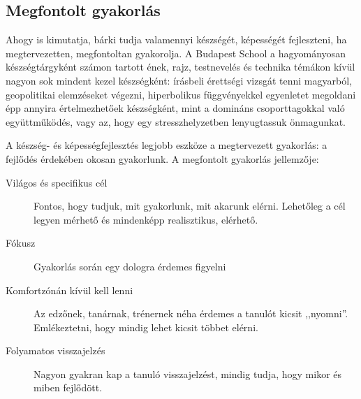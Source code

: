\subsection{Megfontolt gyakorlás}
Ahogy \citep{ericsson2016peak} is kimutatja, bárki tudja valamennyi készségét, képességét fejleszteni, ha megtervezetten, megfontoltan gyakorolja. A Budapest School a hagyományosan készségtárgyként számon tartott ének, rajz, testnevelés és technika témákon kívül nagyon sok mindent kezel készségként: írásbeli érettségi vizsgát tenni magyarból, geopolitikai elemzéseket végezni, hiperbolikus függvényekkel egyenletet megoldani épp annyira értelmezhetőek készségként, mint a domináns csoporttagokkal való együttműködés, vagy az, hogy egy stresszhelyzetben lenyugtassuk önmagunkat.

A készség- és képességfejlesztés legjobb eszköze a megtervezett gyakorlás: a fejlődés érdekében okosan gyakorlunk. A megfontolt gyakorlás jellemzője:

\begin{description}
      \item[Világos és specifikus cél] Fontos, hogy tudjuk, mit gyakorlunk, mit
            akarunk elérni.  Lehetőleg a cél legyen mérhető és mindenképp realisztikus, elérhető.
      \item[Fókusz] Gyakorlás során egy dologra érdemes figyelni
      \item[Komfortzónán kívül kell lenni] Az edzőnek, tanárnak, trénernek
            néha érdemes a tanulót kicsit ,,nyomni''. Emlékeztetni, hogy mindig lehet kicsit többet elérni.
      \item[Folyamatos visszajelzés] Nagyon gyakran kap a tanuló visszajelzést,
            mindig tudja, hogy mikor és miben fejlődött.
\end{description}
